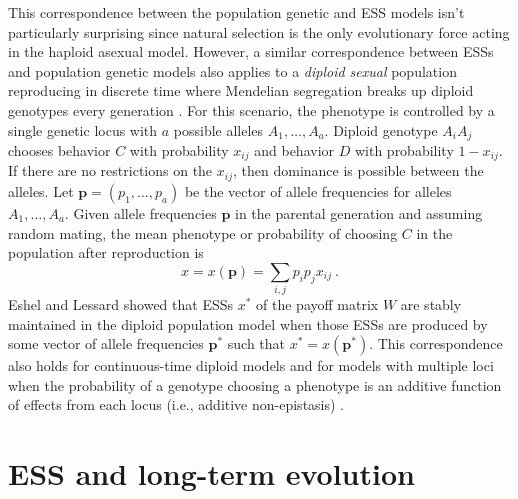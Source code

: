 \documentclass[11pt]{article}
\newcommand{\ess}[1]{#1^*}
\renewcommand{\vec}[1]{\symbf{#1}}
\begin{document}
This correspondence between the population genetic and ESS models isn't particularly surprising since natural selection is the only evolutionary force acting in the haploid asexual model. However, a similar correspondence between ESSs and population genetic models also applies to a \textit{diploid sexual} population reproducing in discrete time where Mendelian segregation breaks up diploid genotypes every generation \cite{Eshel:1982,Lessard:1984}. For this scenario, the phenotype is controlled by a single genetic locus with $a$ possible alleles $A_{1},\ldots,A_{a}$. Diploid genotype $A_{i} A_{j}$ chooses behavior $C$ with probability $x_{ij}$ and behavior $D$ with probability $1-x_{ij}$. If there are no restrictions on the $x_{ij}$, then dominance is possible between the alleles. Let $\vec{p} = (p_{1}, \ldots, p_{a})$ be the vector of allele frequencies for alleles $A_{1},\ldots,A_{a}$. Given allele frequencies $\vec{p}$ in the parental generation and assuming random mating, the mean phenotype or probability of choosing $C$ in the population after reproduction is
\begin{equation*}
  x = x(\vec{p}) = \sum_{i,j} p_{i} p_{j} x_{ij} \: .
\end{equation*}
Eshel and Lessard showed \cite{Eshel:1982,Lessard:1984} that ESSs $\ess{x}$ of the payoff matrix $W$ are stably maintained in the diploid population model when those ESSs are produced by some vector of allele frequencies $\ess{\vec{p}}$ such that $\ess{x} = x(\ess{\vec{p}})$. This correspondence also holds for continuous-time diploid models \cite{Sigmund:1987,Cressman:1988,Cressman:Hofbauer:1996,Hofbauer:Sigmund:1998} and for models with multiple loci when the probability of a genotype choosing a phenotype is an additive function of effects from each locus (i.e., additive non-epistasis) \cite{Eshel:1982}.

\section{ESS and long-term evolution}
\label{sec:long-term}
\end{document}
